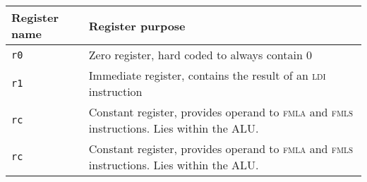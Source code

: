 \begin{centering}[h]
	\begin{tabular}{|l p{10.5cm}|}
		\hline
		\textbf{Register name} & \textbf{Register purpose} \\
		\hline
		\texttt{r0} & Zero register, hard coded to always contain 0 \\
		\texttt{r1} & Immediate register, contains the result of an \textsc{ldi} instruction\\
		\texttt{rc} & Constant register, provides operand to \textsc{fmla} and \textsc{fmls} instructions. Lies within the ALU. \\
		\texttt{rc} & Constant register, provides operand to \textsc{fmla} and \textsc{fmls} instructions. Lies within the ALU. \\
		\hline
	\end{tabular}

	\label{tab:specregs}
	
\end{centering}

